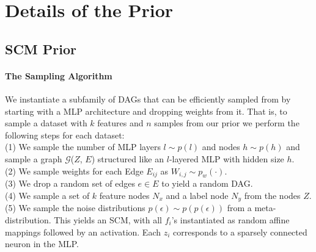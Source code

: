 \documentclass{article}
\begin{document}

\section{Details of the \methodname{} Prior}
\label{app:a prior for tabular data}


\subsection{SCM Prior}
\label{sec:details_scm_prior}
\paragraph{The Sampling Algorithm}
We instantiate a subfamily of DAGs that can be efficiently sampled from by starting with a MLP architecture and dropping weights from it.
That is, to sample a dataset with $k$ features and $n$ samples from our prior we perform the following steps for each dataset: \\
\hphantom{~~~~}(1) We sample the number of MLP layers $l \sim p(l)$ and nodes $h \sim p(h)$ and sample a graph $\mathcal{G}$($Z$, $E$) structured like an $l$-layered MLP with hidden size $h$.\\%
\hphantom{~~~~}(2) We sample weights for each Edge $E_{ij}$%
as $W_{i,j} \sim p_w(\cdot)$.\\
\hphantom{~~~~}(3) We drop a random set of edges $e \in E$ to yield a random DAG.\\
\hphantom{~~~~}(4) We sample a set of $k$ feature nodes $N_x$  and a label node $N_y$ from the nodes $Z$.\\
\hphantom{~~~~}(5) We sample the noise distributions $p(\epsilon) \sim p(p(\epsilon))$ from a meta-distribution.%
This yields an SCM, with all $f_i$'s instantiated as random affine mappings followed by an activation. Each $z_i$ corresponds to a sparsely connected neuron in the MLP.
\end{document}
